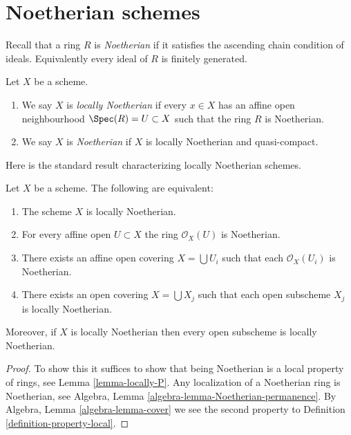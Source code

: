 \section{Noetherian schemes}
\label{section-noetherian}

\noindent
Recall that a ring $R$ is {\it Noetherian} if it satisfies the ascending
chain condition of ideals. Equivalently every ideal of $R$ is finitely
generated.

\begin{definition}
\label{definition-noetherian}
Let $X$ be a scheme.
\begin{enumerate}
\item We say $X$ is {\it locally Noetherian} if every
$x \in X$ has an affine open neighbourhood
$\Spec(R) = U \subset X$ such that the ring $R$ is Noetherian.
\item We say $X$ is {\it Noetherian} if $X$ is locally Noetherian
and quasi-compact.
\end{enumerate}
\end{definition}

\noindent
Here is the standard result characterizing locally Noetherian schemes.

\begin{lemma}
\label{lemma-locally-Noetherian}
Let $X$ be a scheme. The following are equivalent:
\begin{enumerate}
\item The scheme $X$ is locally Noetherian.
\item For every affine open $U \subset X$ the ring $\mathcal{O}_X(U)$
is Noetherian.
\item There exists an affine open covering $X = \bigcup U_i$ such that
each $\mathcal{O}_X(U_i)$ is Noetherian.
\item There exists an open covering $X = \bigcup X_j$
such that each open subscheme $X_j$ is locally Noetherian.
\end{enumerate}
Moreover, if $X$ is locally Noetherian then every open subscheme
is locally Noetherian.
\end{lemma}

\begin{proof}
To show this it suffices to show that being Noetherian is a local
property of rings, see Lemma \ref{lemma-locally-P}.
Any localization of a Noetherian ring is Noetherian, see
Algebra, Lemma \ref{algebra-lemma-Noetherian-permanence}.
By Algebra, Lemma \ref{algebra-lemma-cover} we see the second
property to Definition \ref{definition-property-local}.
\end{proof}

